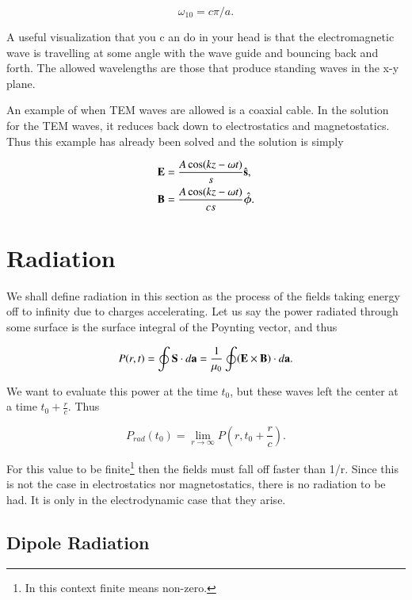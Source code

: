 \documentclass[preprint, review,12pt]{elsarticle}
\def\x{\times}
\def\.{\cdot}
\def\b{\textbf}
\def\9{\left(}
\def\0{\right)}
\newcommand{\hb}[1]{\hat{\b #1}}
\newcommand{\hbm}[1]{\hat{\bm #1}}
\begin{document}
\begin{equation}
    \omega_{10} = c \pi /a.
\end{equation}

A useful visualization that you c an do in your head is that the electromagnetic wave is travelling at some angle with the wave guide and bouncing back and forth. The allowed wavelengths are those that produce standing waves in the x-y plane. 

An example of when TEM waves are allowed is a coaxial cable. In the solution for the TEM waves, it reduces back down to electrostatics and magnetostatics. Thus this example has already been solved and the solution is simply

\begin{equation}
\begin{split}
    & \b E = \frac{A\cos(kz-\omega t)}{s}\hb{s}, \\
    & \b B = \frac{A\cos(kz-\omega t)}{cs}\hbm{\phi}.
\end{split}
\end{equation}

\section{Radiation}

We shall define radiation in this section as the process of the fields taking energy off to infinity due to charges accelerating. Let us say the power radiated through some surface is the surface integral of the Poynting vector, and thus

\begin{equation}
    P(r,t) = \oint \b S \. d \b a = \frac{1}{\mu_0} \oint (\b E \x \b B) \. d\b a.
\end{equation}

We want to evaluate this power at the time $t_0$, but these waves left the center at a time $t_0 + \frac{r}{c}$. Thus 

\begin{equation}
    P_{rad}(t_0) = \lim_{r\to\infty} P \9 r, t_0 + \frac{r}{c} \0.
\end{equation}

For this value to be finite\footnote{In this context finite means non-zero.} then the fields must fall off faster than 1/r. Since this is not the case in electrostatics nor magnetostatics, there is no radiation to be had. It is only in the electrodynamic case that they arise. 

\subsection{Dipole Radiation}
\end{document}

